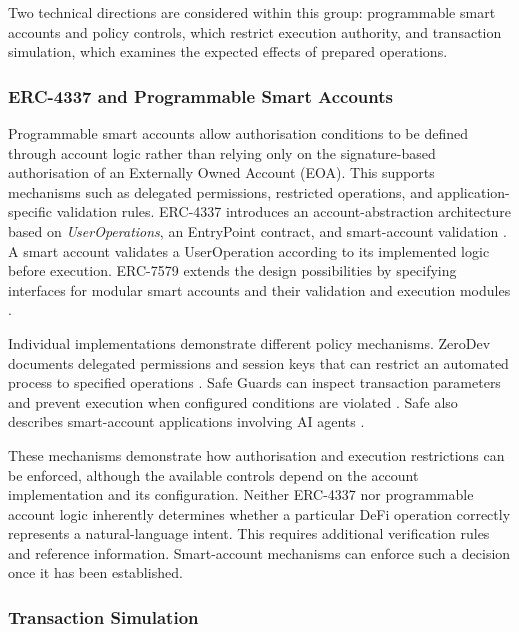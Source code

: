 Two technical directions are considered within this group:
programmable smart accounts and policy controls, which restrict
execution authority, and transaction simulation, which examines
the expected effects of prepared operations.

\subsubsection{ERC-4337 and Programmable Smart Accounts}

Programmable smart accounts allow authorisation conditions to
be defined through account logic rather than relying only on
the signature-based authorisation of an Externally Owned
Account (EOA). This supports mechanisms such as delegated
permissions, restricted operations, and application-specific
validation rules. ERC-4337 introduces an account-abstraction architecture based
on \textit{UserOperations}, an EntryPoint contract, and
smart-account validation
\cite{buterinERC4337AccountAbstraction2021,
linMeasurementInvestigationERC43372024}.
A smart account validates a UserOperation according to its
implemented logic before execution. ERC-7579 extends the
design possibilities by specifying interfaces for modular
smart accounts and their validation and execution modules
\cite{erc7579MinimalModularSmartAccounts2023}.

Individual implementations demonstrate different policy
mechanisms. ZeroDev documents delegated permissions and
session keys that can restrict an automated process to
specified operations
\cite{zeroDevPermissionsSessionKeys2026}.
Safe Guards can inspect transaction parameters and prevent
execution when configured conditions are violated
\cite{safeSmartAccountGuards2026}.
Safe also describes smart-account applications involving
AI agents \cite{safeAIAgentsSmartAccounts2026}.

These mechanisms demonstrate how authorisation and execution
restrictions can be enforced, although the available controls
depend on the account implementation and its configuration.
Neither ERC-4337 nor programmable account logic inherently
determines whether a particular DeFi operation correctly
represents a natural-language intent. This requires additional
verification rules and reference information. Smart-account
mechanisms can enforce such a decision once it has been
established.

\subsubsection{Transaction Simulation}

